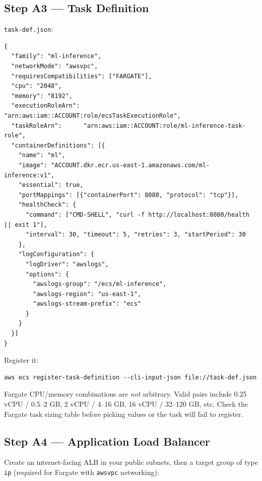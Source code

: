 \documentclass[11pt,a4paper]{article}
\begin{document}
\subsection{Step A3 --- Task Definition}

\texttt{task-def.json}:

\begin{lstlisting}[style=jsoncode]
{
  "family": "ml-inference",
  "networkMode": "awsvpc",
  "requiresCompatibilities": ["FARGATE"],
  "cpu": "2048",
  "memory": "8192",
  "executionRoleArn": "arn:aws:iam::ACCOUNT:role/ecsTaskExecutionRole",
  "taskRoleArn":      "arn:aws:iam::ACCOUNT:role/ml-inference-task-role",
  "containerDefinitions": [{
    "name": "ml",
    "image": "ACCOUNT.dkr.ecr.us-east-1.amazonaws.com/ml-inference:v1",
    "essential": true,
    "portMappings": [{"containerPort": 8080, "protocol": "tcp"}],
    "healthCheck": {
      "command": ["CMD-SHELL", "curl -f http://localhost:8080/health || exit 1"],
      "interval": 30, "timeout": 5, "retries": 3, "startPeriod": 30
    },
    "logConfiguration": {
      "logDriver": "awslogs",
      "options": {
        "awslogs-group": "/ecs/ml-inference",
        "awslogs-region": "us-east-1",
        "awslogs-stream-prefix": "ecs"
      }
    }
  }]
}
\end{lstlisting}

Register it:

\begin{lstlisting}[style=bashcode]
aws ecs register-task-definition --cli-input-json file://task-def.json
\end{lstlisting}

\begin{warnbox}
Fargate CPU/memory combinations are \emph{not} arbitrary. Valid pairs include
0.25 vCPU / 0.5--2 GB, 2 vCPU / 4--16 GB, 16 vCPU / 32--120 GB, etc. Check
the Fargate task sizing table before picking values or the task will fail to
register.
\end{warnbox}

\subsection{Step A4 --- Application Load Balancer}

Create an internet-facing ALB in your public subnets, then a target group of
type \texttt{ip} (required for Fargate with \texttt{awsvpc} networking):
\end{document}
